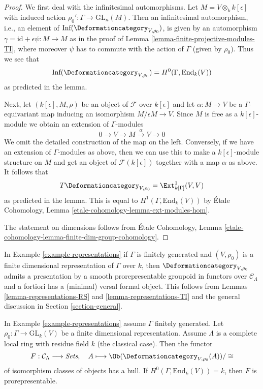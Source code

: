 \begin{proof}
We first deal with the infinitesimal automorphisms.
Let $M = V \otimes_k k[\epsilon]$ with induced action
$\rho_0' : \Gamma \to \text{GL}_n(M)$.
Then an infinitesimal automorphism, i.e., an element of
$\text{Inf}(\Deformationcategory_{V, \rho_0})$,
is given by an automorphism
$\gamma = \text{id} + \epsilon \psi : M \to M$
as in the proof of Lemma \ref{lemma-finite-projective-modules-TI},
where moreover $\psi$ has to commute
with the action of $\Gamma$ (given by $\rho_0$).
Thus we see that
$$
\text{Inf}(\Deformationcategory_{V, \rho_0}) = H^0(\Gamma, \text{End}_k(V))
$$
as predicted in the lemma.

\medskip\noindent
Next, let $(k[\epsilon], M, \rho)$ be an object of $\mathcal{F}$
over $k[\epsilon]$ and let $\alpha : M \to V$ be a $\Gamma$-equivariant map
inducing an isomorphism $M/\epsilon M \to V$.
Since $M$ is free as a $k[\epsilon]$-module we obtain
an extension of $\Gamma$-modules
$$
0 \to V \to M \xrightarrow{\alpha} V \to 0
$$
We omit the detailed construction of the map on the left.
Conversely, if we have an extension of $\Gamma$-modules as
above, then we can use this to make a $k[\epsilon]$-module
structure on $M$ and get an object of $\mathcal{F}(k[\epsilon])$
together with a map $\alpha$ as above.
It follows that
$$
T\Deformationcategory_{V, \rho_0} = \Ext^1_{k[\Gamma]}(V, V)
$$
as predicted in the lemma. This is equal to
$H^1(\Gamma, \text{End}_k(V))$ by
\'Etale Cohomology, Lemma \ref{etale-cohomology-lemma-ext-modules-hom}.

\medskip\noindent
The statement on dimensions follows from
\'Etale Cohomology, Lemma
\ref{etale-cohomology-lemma-finite-dim-group-cohomology}.
\end{proof}

\noindent
In Example \ref{example-representations} if $\Gamma$ is finitely generated
and $(V, \rho_0)$ is a finite dimensional representation of $\Gamma$
over $k$, then $\Deformationcategory_{V, \rho_0}$
admits a presentation by a smooth prorepresentable groupoid in functors
over $\mathcal{C}_\Lambda$
and a fortiori has a (minimal) versal formal object. This follows
from Lemmas \ref{lemma-representations-RS} and \ref{lemma-representations-TI}
and the general discussion in Section \ref{section-general}.

\begin{lemma}
\label{lemma-representations-hull}
In Example \ref{example-representations} assume $\Gamma$ finitely generated.
Let $\rho_0 : \Gamma \to \text{GL}_k(V)$ be a finite dimensional representation.
Assume $\Lambda$ is a complete local ring with residue field $k$
(the classical case). Then the functor
$$
F : \mathcal{C}_\Lambda \longrightarrow \textit{Sets},\quad
A \longmapsto \Ob(\Deformationcategory_{V, \rho_0}(A))/\cong
$$
of isomorphism classes of objects has a hull. If
$H^0(\Gamma, \text{End}_k(V)) = k$, then $F$ is
prorepresentable.
\end{lemma}

